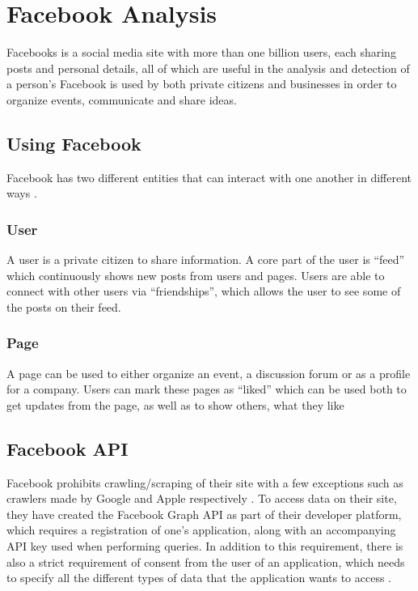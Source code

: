 \section{Facebook Analysis}\label{sec:facebook-analysis}
Facebooks is a social media site with more than one billion users, each
sharing posts and personal details, all of which are useful in the analysis and
detection of a person's \fbp Facebook is used by both private citizens and
businesses in order to organize events, communicate and share ideas. 

\subsection{Using Facebook}
Facebook has two different entities that can interact with one another in
different ways \Source.

\subsubsection{User}
A user is a private citizen to share information. A core part of the user is
``feed'' which continuously shows new posts from users and pages. Users are able
to connect with other users via ``friendships'', which allows the user to see
some of the posts on their feed.

\subsubsection{Page}
A page can be used to either organize an event, a discussion forum or as a
profile for a company. Users can mark these pages as ``liked'' which can be
used both to get updates from the page, as well as to show others, what they
like

\subsection{Facebook API}
Facebook prohibits crawling/scraping of their site with a few exceptions such as
crawlers made by Google and Apple respectively
\citep{FacebookRobotsTxt}.
To access data on their site, they have created the Facebook Graph \ac{API} as
part of their developer platform, which requires a registration of one's
application, along with an accompanying \ac{API} key used when performing
queries.
In addition to this requirement, there is also a strict requirement of consent
from the user of an application, which needs to specify all the different types
of data that the application wants to access
\citep{FacebookGraphApiAccessTokens} \Source .\nl

